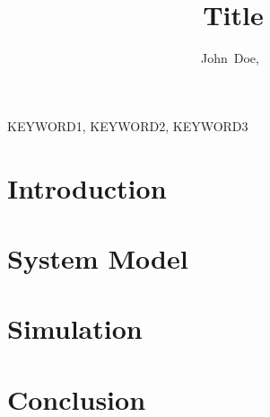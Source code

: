 \documentclass[journal]{IEEEtran}
\begin{document}
    \title{Title}
    \author{John~Doe,~}
\maketitle

\begin{abstract}
    \lipsum[1]
\end{abstract}
\begin{IEEEkeywords}
    KEYWORD1, KEYWORD2, KEYWORD3
\end{IEEEkeywords}

\IEEEpeerreviewmaketitle

\section{Introduction}
 \lipsum \cite{einstein}

\section{System Model}
\lipsum

\section{Simulation}
\lipsum

\section{Conclusion}



\end{document}
